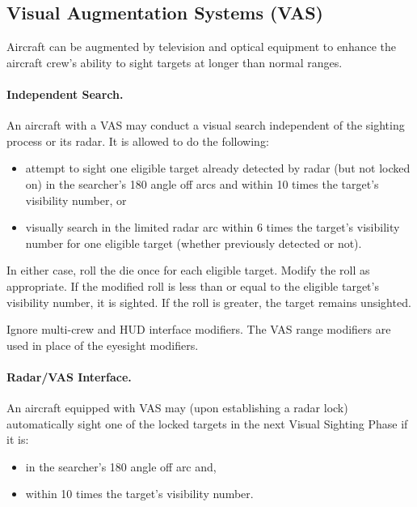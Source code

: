 \begin{advancedrules}

\section{Visual Augmentation Systems (VAS)}
\label{rule:vas}

Aircraft can be augmented by television and optical equipment to enhance the aircraft crew's ability to sight targets at longer than normal ranges.

\paragraph{Independent Search.} An aircraft with a VAS may conduct a visual search independent of the sighting process or its radar. It is allowed to do the following:

\begin{itemize}

    \item attempt to sight one eligible target already detected by radar (but not locked on) in the searcher's 180{\deg} angle off arcs and within 10 times the target's visibility number, or

    \item visually search in the limited radar arc within 6 times the target's visibility number for one eligible target (whether previously detected or not).

\end{itemize}

In either case, roll the die once for each eligible target. Modify the roll as appropriate. If the modified roll is less than or equal to the eligible target's visibility number, it is sighted. If the roll is greater, the target remains unsighted.

Ignore multi-crew and HUD interface modifiers. The VAS range modifiers are used in place of the eyesight modifiers.

\paragraph{Radar/VAS Interface.} An aircraft equipped with VAS may (upon establishing a radar lock) automatically sight one of the locked targets in the next Visual Sighting Phase if it is:

\begin{itemize}
    \item in the searcher's 180{\deg} angle off arc and,
    \item within 10 times the target's visibility number.
\end{itemize}


\end{advancedrules}
